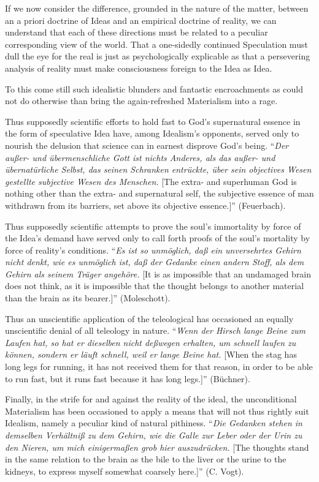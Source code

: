 \documentclass[12pt]{book}
\begin{document}
If we now consider the difference, grounded in the nature of the matter, between an a priori doctrine of
Ideas and an empirical doctrine of reality, we can understand that each of these directions must be
related to a peculiar corresponding view of the world. That a one-sidedly continued Speculation must
dull the eye for the real is just as psychologically explicable as that a persevering analysis of
reality must make consciousness foreign to the Idea as Idea.

To this come still such idealistic blunders and fantastic encroachments as could not do otherwise than
bring the again-refreshed Materialism into a rage.

Thus supposedly scientific efforts to hold fast to God's supernatural essence in the form of speculative
Idea have, among Idealism's opponents, served only to nourish the delusion that science can in earnest
disprove God's being. ``\textit{Der außer- und übermenschliche Gott ist nichts Anderes, als das außer-
und übernatürliche Selbst, das seinen Schranken entrückte, über sein objectives Wesen gestellte
subjective Wesen des Menschen.} [The extra- and superhuman God is nothing other than the extra- and
supernatural self, the subjective essence of man withdrawn from its barriers, set above its objective
essence.]'' (Feuerbach).

Thus supposedly scientific attempts to prove the soul's immortality by force of the Idea's demand have
served only to call forth proofs of the soul's mortality by force of reality's conditions. ``\textit{Es
ist so unmöglich, daß ein unversehrtes Gehirn nicht denkt, wie es unmöglich ist, daß der Gedanke einen
andern Stoff, als dem Gehirn als seinem Träger angehöre.} [It is as impossible that an undamaged brain
does not think, as it is impossible that the thought belongs to another material than the brain as its
bearer.]'' (Moleschott).

Thus an unscientific application of the teleological has occasioned an equally unscientific denial of all
teleology in nature. ``\textit{Wenn der Hirsch lange Beine zum Laufen hat, so hat er dieselben nicht
deßwegen
erhalten, um schnell laufen zu können, sondern er läuft schnell, weil er lange Beine hat.} [When the
stag has long legs for running, it has not received them for that reason, in order to be able to run
fast, but it runs fast because it has long legs.]'' (Büchner).

Finally, in the strife for and against the reality of the ideal, the unconditional Materialism has been
occasioned to apply a means that will not thus rightly suit Idealism, namely a peculiar kind of natural
pithiness. ``\textit{Die Gedanken stehen in demselben Verhältniß zu dem Gehirn, wie die Galle zur Leber
oder der Urin zu den Nieren, um mich einigermaßen grob hier
auszudrücken.} [The thoughts stand in the same relation to the brain as the bile to the liver or the
urine to the kidneys, to express myself somewhat coarsely here.]'' (C. Vogt).
\end{document}
